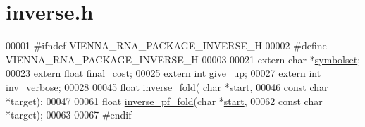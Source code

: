 \hypertarget{inverse_8h_source}{}\section{inverse.\+h}
\label{inverse_8h_source}

\begin{DoxyCode}
00001 \textcolor{preprocessor}{#ifndef VIENNA\_RNA\_PACKAGE\_INVERSE\_H}
00002 \textcolor{preprocessor}{#define VIENNA\_RNA\_PACKAGE\_INVERSE\_H}
00003 
00021 \textcolor{keyword}{extern} \textcolor{keywordtype}{char} *\mbox{\hyperlink{group__inverse__fold_ga8f791e7740a5a28b9f6fafb4e60301d9}{symbolset}};
00023 \textcolor{keyword}{extern}  \textcolor{keywordtype}{float} \mbox{\hyperlink{group__inverse__fold_ga7f17d3b169af048d32bb185039a9c09c}{final\_cost}};
00025 \textcolor{keyword}{extern}  \textcolor{keywordtype}{int}   \mbox{\hyperlink{group__inverse__fold_ga7ec4ba51f86e1717a1e174264e4a75ce}{give\_up}};
00027 \textcolor{keyword}{extern}  \textcolor{keywordtype}{int}   \mbox{\hyperlink{group__inverse__fold_gafcfc65fba01b9cca5946726ed9057a63}{inv\_verbose}};
00028 
00045 \textcolor{keywordtype}{float} \mbox{\hyperlink{group__inverse__fold_ga7af026de55d4babad879f2c92559cbbc}{inverse\_fold}}( \textcolor{keywordtype}{char} *\mbox{\hyperlink{special__const_8h_ab53016e6941484f46238d59e2549decb}{start}},
00046                     \textcolor{keyword}{const} \textcolor{keywordtype}{char} *target);
00047 
00061 \textcolor{keywordtype}{float} \mbox{\hyperlink{group__inverse__fold_gaeef52ecbf2a2450ad585a344f9826806}{inverse\_pf\_fold}}(\textcolor{keywordtype}{char} *\mbox{\hyperlink{special__const_8h_ab53016e6941484f46238d59e2549decb}{start}},
00062                       \textcolor{keyword}{const} \textcolor{keywordtype}{char} *target);
00063 
00067 \textcolor{preprocessor}{#endif}
\end{DoxyCode}
